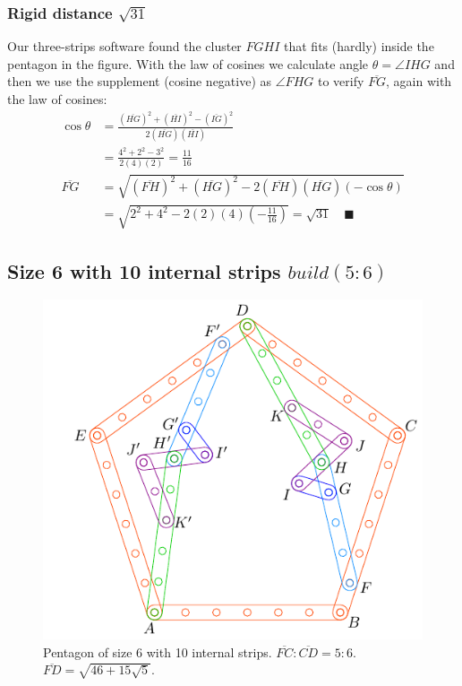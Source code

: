 \documentclass[11pt]{article}
\begin{document}
\subsubsection{Rigid distance $\sqrt{31}$}

Our three-strips software found the cluster $FGHI$ that fits (hardly) inside the pentagon in the figure. With the law of cosines we calculate angle $\theta = \angle{IHG}$ and then we use the supplement (cosine negative) as $\angle{FHG}$ to verify $\overline{FG}$, again with the law of cosines:
\begin{align}
\cos\theta &= \frac{(\overline{HG})^2 + (\overline{HI})^2 - (\overline{IG})^2}
 {2(\overline{HG})(\overline{HI})} \nonumber\\
 &= \frac{4^2 + 2^2 - 3^2}{2(4)(2)} = \frac{11}{16} \\
\overline{FG} &= \sqrt{(\overline{FH})^2 + (\overline{HG})^2 
 - 2(\overline{FH})(\overline{HG})(-\cos\theta) } \nonumber\\
 &= \sqrt{2^2 + 4^2 - 2(2)(4)\left(-\frac{11}{16}\right)}
 = \sqrt{31} \quad \blacksquare
\end{align}

\subsection{Size 6 with 10 internal strips $build(5:6)$}

\begin{figure}[H]
\centering
\includegraphics[scale=1]{6/penta6-10a}
\caption{Pentagon of size 6 with 10 internal strips. $\overline{FC} : \overline{CD} = 5:6$. $\overline{FD} = \sqrt{46 + 15\sqrt5}$.}
\label{fig:penta6-10a}
\end{figure}
\end{document}
